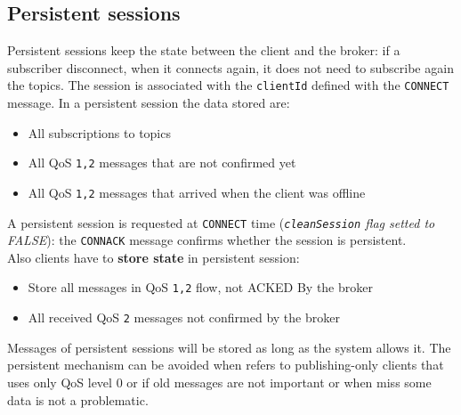\documentclass[10pt,a4paper]{report}
\theoremstyle{definition}
\begin{document}
\subsection{Persistent sessions}\label{sec:persistent-sessions}
Persistent sessions keep the state between the client and the broker: if a subscriber disconnect, when it connects again, it does not need to subscribe again the topics. The session is associated with the \texttt{clientId} defined with the \texttt{CONNECT} message.
In a persistent session the data stored are:
\begin{itemize}
	\item 
	All subscriptions to topics
	\item 
	All QoS \texttt{1,2} messages that are not confirmed yet
	\item 
	All QoS \texttt{1,2} messages that arrived when the client was offline
\end{itemize}
A persistent session is requested at \texttt{CONNECT} time (\textit{\texttt{cleanSession} flag setted to FALSE}): the \texttt{CONNACK} message confirms whether the session is persistent.\\
Also clients have to \textbf{store state} in persistent session:
\begin{itemize}
	\item 
	Store all messages in QoS \texttt{1,2} flow, not ACKED By the broker
	\item 
	All received QoS \texttt{2} messages not confirmed by the broker
	
\end{itemize}
Messages of persistent sessions will be stored as long as the system allows it. The persistent mechanism can be avoided when refers to publishing-only clients that uses only QoS level 0 or if old messages are not important or when miss some data is not a problematic.
\end{document}
